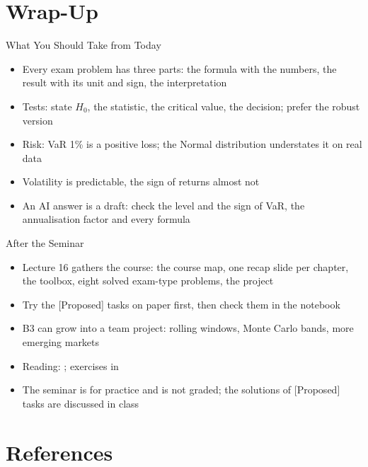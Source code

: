 \section{Wrap-Up}

\begin{frame}{What You Should Take from Today}
\itemsize{\small}
\begin{itemize}
    \item Every exam problem has three parts: the formula with the numbers, the result with its unit and sign, the interpretation
    \item Tests: state $H_0$, the statistic, the critical value, the decision; prefer the robust version
    \item Risk: VaR 1\% is a positive loss; the Normal distribution understates it on real data
    \item Volatility is predictable, the sign of returns almost not
    \item An AI answer is a draft: check the level and the sign of VaR, the annualisation factor and every formula
\end{itemize}
\end{frame}

\begin{frame}{After the Seminar}
\itemsize{\small}
\begin{itemize}
    \item Lecture 16 gathers the course: the course map, one recap slide per chapter, the toolbox, eight solved exam-type problems, the project
    \item Try the [Proposed] tasks on paper first, then check them in the notebook
    \item B3 can grow into a team project: rolling windows, Monte Carlo bands, more emerging markets
    \item Reading: ; exercises in 
    \item The seminar is for practice and is not graded; the solutions of [Proposed] tasks are discussed in class
\end{itemize}
\end{frame}


\section{References}

